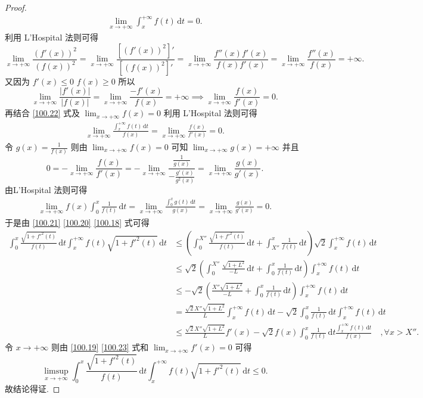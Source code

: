 \documentclass[../../main.tex]{subfiles}%
\begin{document}
\begin{proof}
\begin{align}
\lim_{x \to +\infty} \int_x^{+\infty} f(t) \, \mathrm{d}t = 0 \label{100.22}.
\end{align}
利用 L’Hospital 法则可得
\[
\lim_{x \to +\infty} \frac{(f'(x))^2}{(f(x))^2} = \lim_{x \to +\infty} \frac{[(f'(x))^2]'}{[(f(x))^2]'} = \lim_{x \to +\infty} \frac{f''(x)f'(x)}{f(x)f'(x)} = \lim_{x \to +\infty} \frac{f''(x)}{f(x)} = +\infty.
\]
又因为 \( f'(x) \leqslant 0 \) \( f(x) \geqslant 0 \) 所以
\[
\lim_{x \to +\infty} \frac{|f'(x)|}{|f(x)|} = \lim_{x \to +\infty} \frac{-f'(x)}{f(x)} = +\infty \implies \lim_{x \to +\infty} \frac{f(x)}{f'(x)} = 0.
\]
再结合 \eqref{100.22} 式及 \( \lim_{x \to +\infty} f(x) = 0 \) 利用 L’Hospital 法则可得
\begin{align}
\lim_{x \to +\infty} \frac{\int_x^{+\infty} f(t) \, \mathrm{d}t}{f(x)} = \lim_{x \to +\infty} \frac{f(x)}{f'(x)} = 0 \label{100.23}.
\end{align}
令 \( g(x) = \frac{1}{f(x)} \) 则由 \( \lim_{x \to +\infty} f(x) = 0 \) 可知 \( \lim_{x \to +\infty} g(x) = +\infty \) 并且
\[
0 = -\lim_{x \to +\infty} \frac{f(x)}{f'(x)} = -\lim_{x \to +\infty} \frac{\frac{1}{g(x)}}{-\frac{g'(x)}{g^2(x)}} = \lim_{x \to +\infty} \frac{g(x)}{g'(x)}.
\]
由L’Hospital 法则可得
\begin{align}
\lim_{x \to +\infty} f(x) \int_0^x \frac{1}{f(t)} \, \mathrm{d}t = \lim_{x \to +\infty} \frac{\int_0^x g(t) \, \mathrm{d}t}{g(x)} = \lim_{x \to +\infty} \frac{g(x)}{g'(x)} = 0 \label{100.19}.
\end{align}
于是由 \eqref{100.21} \eqref{100.20} \eqref{100.18} 式可得
\begin{align*}
\int_0^x \frac{\sqrt{1 + f'^2(t)}}{f(t)} \, \mathrm{d}t \int_x^{+\infty} f(t)\sqrt{1 + f'^2(t)} \, \mathrm{d}t 
&\leqslant \left( \int_0^{X''} \frac{\sqrt{1 + f'^2(t)}}{f(t)} \, \mathrm{d}t + \int_{X''}^x \frac{1}{f(t)} \, \mathrm{d}t \right) \sqrt{2} \int_x^{+\infty} f(t) \, \mathrm{d}t \\
&\leqslant \sqrt{2} \left( \int_0^{X''} \frac{\sqrt{1 + L^2}}{-L} \, \mathrm{d}t + \int_0^x \frac{1}{f(t)} \, \mathrm{d}t \right) \int_x^{+\infty} f(t) \, \mathrm{d}t \\
&\leqslant -\sqrt{2} \left( \frac{X'' \sqrt{1 + L^2}}{-L} + \int_0^x \frac{1}{f(t)} \, \mathrm{d}t \right) \int_x^{+\infty} f(t) \, \mathrm{d}t \\
&= \frac{\sqrt{2} X'' \sqrt{1 + L^2}}{L} \int_x^{+\infty} f(t) \, \mathrm{d}t - \sqrt{2} \int_0^x \frac{1}{f(t)} \, \mathrm{d}t \int_x^{+\infty} f(t) \, \mathrm{d}t \\
&\leqslant \frac{\sqrt{2} X'' \sqrt{1 + L^2}}{L} f'(x) - \sqrt{2} f(x) \int_0^x \frac{1}{f(t)} \, \mathrm{d}t \frac{\int_x^{+\infty} f(t) \, \mathrm{d}t}{f(x)} \quad ,\forall x > X''.
\end{align*}
令 \( x \to +\infty \) 则由 \eqref{100.19} \eqref{100.23} 式和 \( \lim_{x \to +\infty} f'(x) = 0 \) 可得
\[
\limsup_{x \to +\infty} \int_0^x \frac{\sqrt{1 + f'^2(t)}}{f(t)} \, \mathrm{d}t \int_x^{+\infty} f(t)\sqrt{1 + f'^2(t)} \, \mathrm{d}t \leqslant 0.
\]
故结论得证.

\end{proof}
\end{document}
